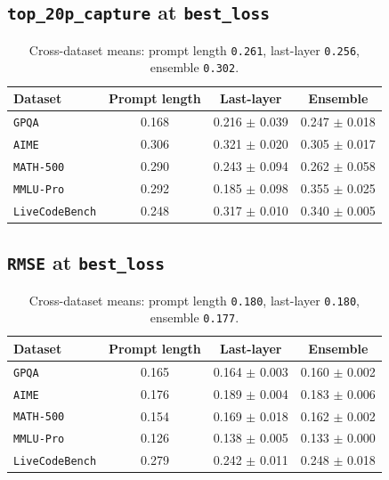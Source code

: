 \documentclass[11pt]{article}
\begin{document}
\subsection*{\texttt{top\_20p\_capture} at \texttt{best\_loss}}

\begin{table}[h]
\centering
\small
\begin{tabular}{lccc}
\toprule
Dataset & Prompt length & Last-layer & Ensemble \\
\midrule
\texttt{GPQA} & 0.168 & 0.216 $\pm$ 0.039 & 0.247 $\pm$ 0.018 \\
\texttt{AIME} & 0.306 & 0.321 $\pm$ 0.020 & 0.305 $\pm$ 0.017 \\
\texttt{MATH-500} & 0.290 & 0.243 $\pm$ 0.094 & 0.262 $\pm$ 0.058 \\
\texttt{MMLU-Pro} & 0.292 & 0.185 $\pm$ 0.098 & 0.355 $\pm$ 0.025 \\
\texttt{LiveCodeBench} & 0.248 & 0.317 $\pm$ 0.010 & 0.340 $\pm$ 0.005 \\
\bottomrule
\end{tabular}
\caption{Cross-dataset means: prompt length \texttt{0.261}, last-layer \texttt{0.256}, ensemble \texttt{0.302}.}
\end{table}

\subsection*{\texttt{RMSE} at \texttt{best\_loss}}

\begin{table}[h]
\centering
\small
\begin{tabular}{lccc}
\toprule
Dataset & Prompt length & Last-layer & Ensemble \\
\midrule
\texttt{GPQA} & 0.165 & 0.164 $\pm$ 0.003 & 0.160 $\pm$ 0.002 \\
\texttt{AIME} & 0.176 & 0.189 $\pm$ 0.004 & 0.183 $\pm$ 0.006 \\
\texttt{MATH-500} & 0.154 & 0.169 $\pm$ 0.018 & 0.162 $\pm$ 0.002 \\
\texttt{MMLU-Pro} & 0.126 & 0.138 $\pm$ 0.005 & 0.133 $\pm$ 0.000 \\
\texttt{LiveCodeBench} & 0.279 & 0.242 $\pm$ 0.011 & 0.248 $\pm$ 0.018 \\
\bottomrule
\end{tabular}
\caption{Cross-dataset means: prompt length \texttt{0.180}, last-layer \texttt{0.180}, ensemble \texttt{0.177}.}
\end{table}
\end{document}
